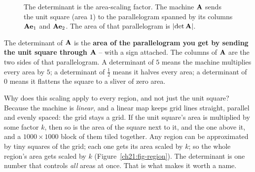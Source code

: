 \begin{figure}[H]
\centering
{}
\caption{The determinant is the area-scaling factor. The machine $\mathbf{A}$ sends
the unit square (area $1$) to the parallelogram spanned by its columns
$\mathbf{A}\mathbf{e}_1$ and $\mathbf{A}\mathbf{e}_2$. The area of that parallelogram is
$\lvert\det\mathbf{A}\rvert$.}
\label{ch21:fig-unitbox}
\end{figure}

\begin{intuitionbox}
The determinant of $\mathbf{A}$ is the \textbf{area of the parallelogram you get by
sending the unit square through $\mathbf{A}$} -- with a sign attached. The columns of
$\mathbf{A}$ are the two sides of that parallelogram. A determinant of $5$ means the
machine multiplies every area by $5$; a determinant of $\tfrac{1}{2}$ means it
halves every area; a determinant of $0$ means it flattens the square to a sliver
of zero area.
\end{intuitionbox}

Why does this scaling apply to every region, and not just the unit square? Because the machine is
\emph{linear}, and a linear map keeps grid lines straight, parallel and evenly spaced: the grid stays a grid.
If the unit square's area is multiplied by some factor $k$, then so is the area of
the square next to it, and the one above it, and a $1000\times 1000$ block of
them tiled together. Any region can be approximated by tiny squares of
the grid; each one gets its area scaled by $k$; so the whole region's area gets
scaled by $k$ (Figure~\ref{ch21:fig-region}). The determinant is one number that controls \emph{all} areas at
once. That is what makes it worth a name.

